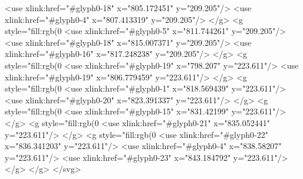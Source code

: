  <use xlink:href="#glyph0-18" x="805.172451" y="209.205"/>
  <use xlink:href="#glyph0-4" x="807.413319" y="209.205"/>
</g>
<g style="fill:rgb(0%
  <use xlink:href="#glyph0-5" x="811.744261" y="209.205"/>
  <use xlink:href="#glyph0-18" x="815.007371" y="209.205"/>
  <use xlink:href="#glyph0-16" x="817.248238" y="209.205"/>
</g>
<g style="fill:rgb(0%
  <use xlink:href="#glyph0-19" x="798.207" y="223.611"/>
  <use xlink:href="#glyph0-19" x="806.779459" y="223.611"/>
</g>
<g style="fill:rgb(0%
  <use xlink:href="#glyph0-1" x="818.569439" y="223.611"/>
  <use xlink:href="#glyph0-20" x="823.391337" y="223.611"/>
</g>
<g style="fill:rgb(0%
  <use xlink:href="#glyph0-15" x="831.42199" y="223.611"/>
</g>
<g style="fill:rgb(0%
  <use xlink:href="#glyph0-21" x="835.052441" y="223.611"/>
</g>
<g style="fill:rgb(0%
  <use xlink:href="#glyph0-22" x="836.341203" y="223.611"/>
  <use xlink:href="#glyph0-4" x="838.58207" y="223.611"/>
  <use xlink:href="#glyph0-23" x="843.184792" y="223.611"/>
</g>
</g>
</svg>
